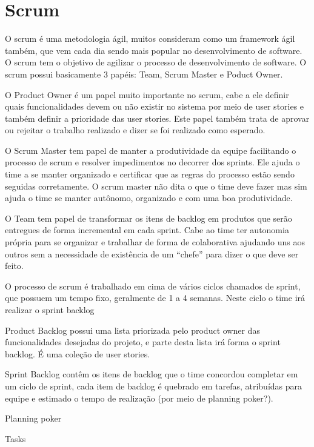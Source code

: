 \documentclass{abnt}
\begin{document}
	\blindtext
	
	\section{Scrum}
		O scrum é uma metodologia ágil, muitos consideram como um framework ágil também, que vem cada dia sendo mais popular
		no desenvolvimento de software.
		O scrum tem o objetivo de agilizar o processo de desenvolvimento de software. O scrum possui basicamente 3
		papéis: Team, Scrum Master e Poduct Owner.
		
		O Product Owner é um papel muito importante no scrum, cabe a ele definir quais funcionalidades devem ou
		não existir no sistema por meio de user stories e também definir a prioridade das user stories. Este papel também
		trata de aprovar ou rejeitar o trabalho realizado e dizer se foi realizado como esperado.
		
		O Scrum Master tem papel de manter a produtividade da equipe facilitando o processo de scrum e resolver impedimentos
		no decorrer dos sprints. Ele ajuda o time a se manter organizado e certificar que as regras do processo estão sendo
		seguidas corretamente. O scrum master não dita o que o time deve fazer mas sim ajuda o time se manter autônomo,
		organizado e com uma boa produtividade. 
		
		O Team tem papel de transformar os itens de backlog em produtos que serão entregues de forma incremental em cada
		sprint. Cabe ao time ter autonomia própria para se organizar e trabalhar de forma de colaborativa ajudando uns aos
		outros sem a necessidade de existência de um ``chefe'' para dizer o que deve ser feito.
		
		O processo de scrum é trabalhado em cima de vários ciclos chamados de sprint, que possuem um tempo fixo, geralmente de
		1 a 4 semanas. Neste ciclo o time irá realizar o sprint backlog
		
		Product Backlog possui uma lista priorizada pelo product owner das funcionalidades desejadas do projeto, e parte
		desta lista irá forma o sprint backlog. É uma coleção de user stories.
		
		Sprint Backlog contêm os itens de backlog que o time concordou completar em um ciclo de sprint, cada item de backlog é
		quebrado em tarefas, atribuídas para equipe e estimado o tempo de realização (por meio de planning poker?).
		
		Planning poker
		
		Tasks
		
\end{document}
